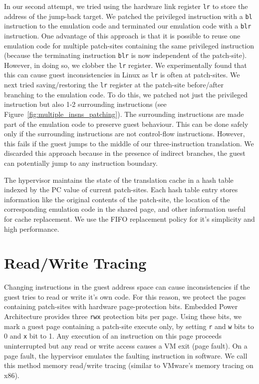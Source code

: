 \documentclass[10pt,twocolumn]{article}
\begin{document}
In our second attempt, we tried using the hardware link register {\tt lr} to store
the address
of the jump-back target. We patched the privileged instruction with a {\tt bl}
instruction to the emulation code and terminated our emulation code with a {\tt blr}
instruction. One advantage of this approach is that it is possible to
reuse one emulation code
for multiple patch-sites containing the same privileged instruction (because the
terminating instruction {\tt blr} is now independent of the patch-site). However, in
doing so, we
clobber the {\tt lr} register. We experimentally found that this can cause
guest inconsistencies in Linux as {\tt lr} is often at patch-sites.
We next tried saving/restoring the
{\tt lr} register at the patch-site before/after branching to the emulation code.
To do this, we patched not just the privileged instruction but also 1-2
surrounding instructions (see Figure~\ref{fig:multiple_insns_patching}). The
surrounding instructions are made part of the emulation code to preserve
guest behaviour. This can
be done safely only if the surrounding instructions are not control-flow instructions.
However, this fails if the guest jumps to the middle of our
three-instruction translation. We discarded this approach because in the presence
of indirect branches, the guest can potentially jump to any instruction boundary.

The hypervisor maintains the state of the translation cache in
a hash table indexed by the PC value of current patch-sites. Each hash table
entry stores information like the original contents of the patch-site,
the location of the corresponding emulation code in the shared page, and other
information useful
for cache replacement. We use the FIFO replacement policy for it's simplicity
and high performance.
\section{Read/Write Tracing}
\label{sec:tracing}
Changing instructions in the guest address space can cause
inconsistencies if the guest tries to read or write it's own code.
For this reason, we protect the pages containing patch-sites with hardware
page-protection bits. Embedded Power Architecture provides three {\tt rwx}
protection bits per page. Using these bits, we mark a guest page containing a patch-site
execute only, by setting {\tt r} and {\tt w} bits to 0 and {\tt x} bit to 1.
Any execution of an instruction on this page proceeds uninterrupted
but any read or write access causes a VM exit (page fault).
On a page fault, the hypervisor
emulates the faulting instruction in software. We call this
method memory read/write tracing (similar to VMware's memory tracing
on x86\cite{agesen:comparison}).
\end{document}
